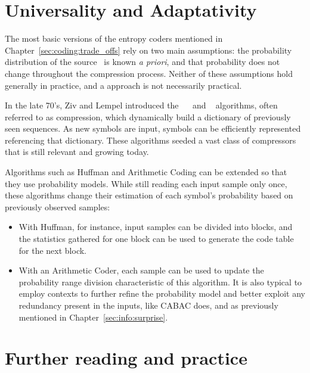 \section{Universality and Adaptativity}\label{sec:coding:adaptativity}

The most basic versions of the entropy coders mentioned in Chapter~\ref{sec:coding:trade_offs}
rely on two main assumptions: the probability distribution of the source \source\ is known \textit{a priori},
and that probability does not change throughout the compression process. Neither of these assumptions hold
generally in practice, and a  approach is not necessarily practical.

In the late 70's, Ziv and Lempel introduced the ~\cite[\S 5.4.1]{sayood_introduction}~\cite{lz77}
and ~\cite[\S 5.4.1]{sayood_introduction} algorithms,
often referred to as  compression, which dynamically build a dictionary of previously
seen sequences. As new symbols are input, symbols can be efficiently represented referencing that dictionary.
These algorithms seeded a vast class of compressors that is still relevant and growing today.

Algorithms such as Huffman and Arithmetic Coding can be extended so that they use  probability
models. While still reading each input sample only once, these algorithms change their estimation of each symbol's
probability based on previously observed samples:
\begin{itemize}
\item  With Huffman, for instance, input samples can be divided into blocks, and
the statistics gathered for one block can be used to generate the code table for the next block.

\item With an Arithmetic Coder, each sample can be used to update the probability range division
characteristic of this algorithm. It is also typical to employ contexts to further refine the
probability model and better exploit any redundancy present in the inputs,
like CABAC does, and as previously mentioned in Chapter~\ref{sec:info:surprise}.
\end{itemize}

\section*{Further reading and practice}
\vspace{0.25cm}

